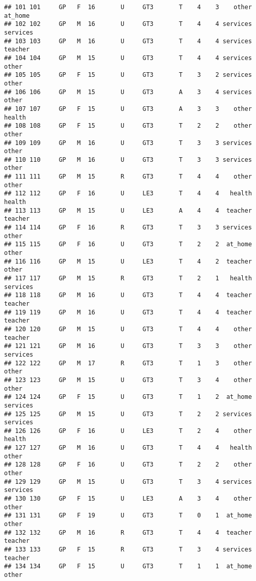 \documentclass[]{article}
\begin{document}
\begin{verbatim}
## 101 101     GP   F  16       U     GT3       T    4    3    other  at_home
## 102 102     GP   M  16       U     GT3       T    4    4 services services
## 103 103     GP   M  16       U     GT3       T    4    4 services  teacher
## 104 104     GP   M  15       U     GT3       T    4    4 services    other
## 105 105     GP   F  15       U     GT3       T    3    2 services    other
## 106 106     GP   M  15       U     GT3       A    3    4 services    other
## 107 107     GP   F  15       U     GT3       A    3    3    other   health
## 108 108     GP   F  15       U     GT3       T    2    2    other    other
## 109 109     GP   M  16       U     GT3       T    3    3 services    other
## 110 110     GP   M  16       U     GT3       T    3    3 services    other
## 111 111     GP   M  15       R     GT3       T    4    4    other    other
## 112 112     GP   F  16       U     LE3       T    4    4   health   health
## 113 113     GP   M  15       U     LE3       A    4    4  teacher  teacher
## 114 114     GP   F  16       R     GT3       T    3    3 services    other
## 115 115     GP   F  16       U     GT3       T    2    2  at_home    other
## 116 116     GP   M  15       U     LE3       T    4    2  teacher    other
## 117 117     GP   M  15       R     GT3       T    2    1   health services
## 118 118     GP   M  16       U     GT3       T    4    4  teacher  teacher
## 119 119     GP   M  16       U     GT3       T    4    4  teacher  teacher
## 120 120     GP   M  15       U     GT3       T    4    4    other  teacher
## 121 121     GP   M  16       U     GT3       T    3    3    other services
## 122 122     GP   M  17       R     GT3       T    1    3    other    other
## 123 123     GP   M  15       U     GT3       T    3    4    other    other
## 124 124     GP   F  15       U     GT3       T    1    2  at_home services
## 125 125     GP   M  15       U     GT3       T    2    2 services services
## 126 126     GP   F  16       U     LE3       T    2    4    other   health
## 127 127     GP   M  16       U     GT3       T    4    4   health    other
## 128 128     GP   F  16       U     GT3       T    2    2    other    other
## 129 129     GP   M  15       U     GT3       T    3    4 services services
## 130 130     GP   F  15       U     LE3       A    3    4    other    other
## 131 131     GP   F  19       U     GT3       T    0    1  at_home    other
## 132 132     GP   M  16       R     GT3       T    4    4  teacher  teacher
## 133 133     GP   F  15       R     GT3       T    3    4 services  teacher
## 134 134     GP   F  15       U     GT3       T    1    1  at_home    other

\end{verbatim}
\end{document}
